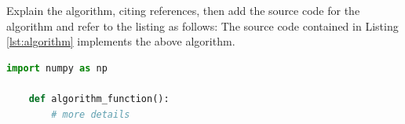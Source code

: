 \documentclass[a4paper, notitlepage, 11pt]{article}
\begin{document}
Explain the algorithm, citing references, then add the source code for the algorithm and refer to the listing as follows: The source code contained in Listing \ref{lst:algorithm} implements the above algorithm.


\begin{lstlisting}[caption={Some algorithm code},label={lst:algorithm},language=Python]
    import numpy as np
    
    def algorithm_function():
        # more details

\end{lstlisting}  






\clearpage
\appendix 
{}


\clearpage


\clearpage

\end{document}
